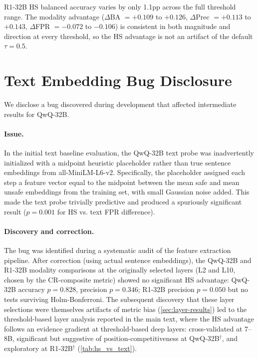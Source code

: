 R1-32B HS balanced accuracy varies by only 1.1pp across the full threshold range. The modality advantage ($\Delta$BA $= +0.109$ to $+0.126$, $\Delta$Prec $= +0.113$ to $+0.143$, $\Delta$FPR $= -0.072$ to $-0.106$) is consistent in both magnitude and direction at every threshold, so the HS advantage is not an artifact of the default $\tau{=}0.5$.


\section{Text Embedding Bug Disclosure}
\label{app:bug}

We disclose a bug discovered during development that affected intermediate results for QwQ-32B.

\paragraph{Issue.} In the initial text baseline evaluation, the QwQ-32B text probe was inadvertently initialized with a midpoint heuristic placeholder rather than true sentence embeddings from all-MiniLM-L6-v2. Specifically, the placeholder assigned each step a feature vector equal to the midpoint between the mean safe and mean unsafe embeddings from the training set, with small Gaussian noise added. This made the text probe trivially predictive and produced a spuriously significant result ($p{=}0.001$ for HS vs. text FPR difference).

\paragraph{Discovery and correction.} The bug was identified during a systematic audit of the feature extraction pipeline. After correction (using actual sentence embeddings), the QwQ-32B and R1-32B modality comparisons at the originally selected layers (L2 and L10, chosen by the CR-composite metric) showed no significant HS advantage: QwQ-32B accuracy $p{=}0.828$, precision $p{=}0.346$; R1-32B precision $p{=}0.050$ but no tests surviving Holm-Bonferroni. The subsequent discovery that these layer selections were themselves artifacts of metric bias (\cref{sec:layer-results}) led to the threshold-based layer analysis reported in the main text, where the HS advantage follows an evidence gradient at threshold-based deep layers: cross-validated at 7--8B, significant but suggestive of position-competitiveness at QwQ-32B$^\dagger$, and exploratory at R1-32B$^\dagger$ (\cref{tab:hs_vs_text}).


